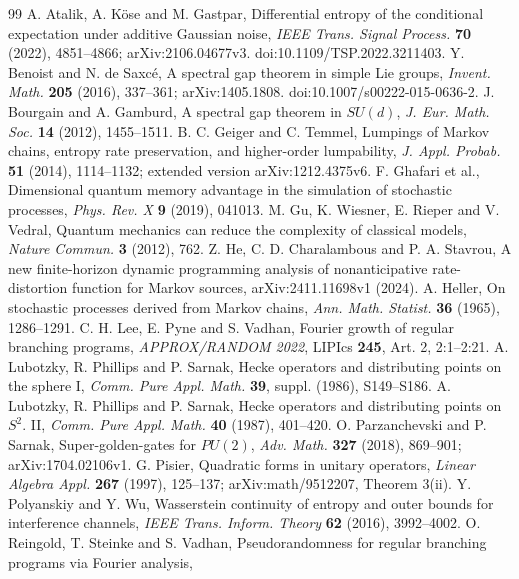 \begin{thebibliography}{99}
 A. Atalik, A. K\"ose and M. Gastpar,
Differential entropy of the conditional expectation under additive Gaussian noise,
\emph{IEEE Trans. Signal Process.} \textbf{70} (2022), 4851--4866;
arXiv:2106.04677v3. doi:10.1109/TSP.2022.3211403.
 Y. Benoist and N. de Saxc\'e,
A spectral gap theorem in simple Lie groups,
\emph{Invent. Math.} \textbf{205} (2016), 337--361;
arXiv:1405.1808. doi:10.1007/s00222-015-0636-2.
 J. Bourgain and A. Gamburd,
A spectral gap theorem in $SU(d)$,
\emph{J. Eur. Math. Soc.} \textbf{14} (2012), 1455--1511.
 B. C. Geiger and C. Temmel,
Lumpings of Markov chains, entropy rate preservation, and higher-order lumpability,
\emph{J. Appl. Probab.} \textbf{51} (2014), 1114--1132;
extended version arXiv:1212.4375v6.
 F. Ghafari et al.,
Dimensional quantum memory advantage in the simulation of stochastic processes,
\emph{Phys. Rev. X} \textbf{9} (2019), 041013.
 M. Gu, K. Wiesner, E. Rieper and V. Vedral,
Quantum mechanics can reduce the complexity of classical models,
\emph{Nature Commun.} \textbf{3} (2012), 762.
 Z. He, C. D. Charalambous and P. A. Stavrou,
A new finite-horizon dynamic programming analysis of nonanticipative
rate-distortion function for Markov sources,
arXiv:2411.11698v1 (2024).
 A. Heller,
On stochastic processes derived from Markov chains,
\emph{Ann. Math. Statist.} \textbf{36} (1965), 1286--1291.
 C. H. Lee, E. Pyne and S. Vadhan,
Fourier growth of regular branching programs,
\emph{APPROX/RANDOM 2022}, LIPIcs \textbf{245}, Art. 2, 2:1--2:21.
 A. Lubotzky, R. Phillips and P. Sarnak,
Hecke operators and distributing points on the sphere I,
\emph{Comm. Pure Appl. Math.} \textbf{39}, suppl. (1986), S149--S186.
 A. Lubotzky, R. Phillips and P. Sarnak,
Hecke operators and distributing points on $S^2$. II,
\emph{Comm. Pure Appl. Math.} \textbf{40} (1987), 401--420.
 O. Parzanchevski and P. Sarnak,
Super-golden-gates for $PU(2)$,
\emph{Adv. Math.} \textbf{327} (2018), 869--901;
arXiv:1704.02106v1.
 G. Pisier,
Quadratic forms in unitary operators,
\emph{Linear Algebra Appl.} \textbf{267} (1997), 125--137;
arXiv:math/9512207, Theorem 3(ii).
 Y. Polyanskiy and Y. Wu,
Wasserstein continuity of entropy and outer bounds for interference channels,
\emph{IEEE Trans. Inform. Theory} \textbf{62} (2016), 3992--4002.
 O. Reingold, T. Steinke and S. Vadhan,
Pseudorandomness for regular branching programs via Fourier analysis,

\end{thebibliography}
